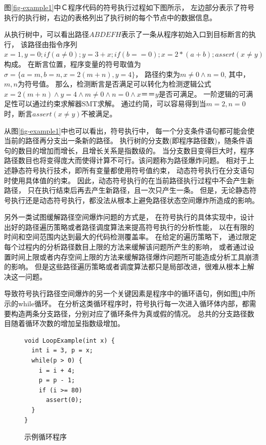 图\ref{fig-example1}中Ｃ程序代码的符号执行过程如下图所示，
左边部分表示了符号执行的执行树，右边的表格列出了执行树的每个节点中的数据信息。

从执行树中，可以看出路径$ABDEFH$表示了一条从程序初始入口到目标断言的执行，
该路径由指令序列$x=1,y=0;if(a\neq 0);y=3+x;if(b==0);x=2*(a+b);assert(x\neq y)$构成。
在断言位置，程序变量的符号取值为$\sigma = \{a = m, b = n, x=2(m+n), y=4\}$，
路径约束为$m \neq 0 \wedge n =0$, 其中，$m,n$为符号值。
那么，检测断言是否满足可以转化为检测逻辑公式
$x=2(m+n)　\wedge y=4 \wedge m \neq 0 \wedge n =0 \wedge x　＝＝ y$是否可满足。
一阶逻辑的可满足性可以通过约束求解器SMT求解。
通过约简，可以容易得到当$m = 2, n = 0$时，断言$assert(x\neq y)$不被满足。

从图\ref{fig-example1}中也可以看出，符号执行中，
每一个分支条件语句都可能会使当前的路径再分支出一条新的路径。
执行树的分支数(即程序路径数)，随条件语句的数目的增加而增长，且增长关系是指数级的。
当分支数目变得巨大时，程序路径数目也将变得庞大而使得计算不可行。该问题称为路径爆炸问题。
相对于上述静态符号执行技术，即所有变量都使用符号值约束，
动态符号执行在分支语句时使用具体值的约束。
因此，动态符号执行的在当前路径执行过程中不会产生新路径，
只在执行结束后再去产生新路径，且一次只产生一条。
但是，无论静态符号执行还是动态符号执行，都没法从根本上避免路径状态空间爆炸所造成的影响。

另外一类试图缓解路径空间爆炸问题的方式是，
在符号执行的具体实现中，设计出好的路径遍历策略或者路径调度算法来提高符号执行的分析性能，
以在有限的时间和空间范围内达到最大的代码检测覆盖率。
在给定的遍历策略下，
通过限定每个过程内的分析路径数目上限的方法来缓解该问题所产生的影响，
或者通过设置时间上限或者内存空间上限的方法来缓解路径爆炸问题所可能造成分析工具崩溃的影响。
但是这些路径遍历策略或者调度算法都只是局部改进，很难从根本上解决这一问题。


导致符号执行路径空间爆炸的另一个关键因素是程序中的循环语句，例如图\ref{fig-example2}中所示的while循环。
在分析这类循环程序时，符号执行每一次进入循环体内部，都需要构造两条分支路径，分别对应了循环条件为真或假的情况。
总共的分支路径数目随着循环次数的增加呈指数级增加。


\begin{figure}[h]
\begin{lstlisting}
void LoopExample(int x) {
  int i = 3, p = x;
  while(p > 0) {
    i = i + 4;
    p = p - 1;
	if (i >= 80)
	  assert(0);
  }
}
\end{lstlisting}
\caption{示例循环程序}
\label{fig-example2}
\end{figure}

